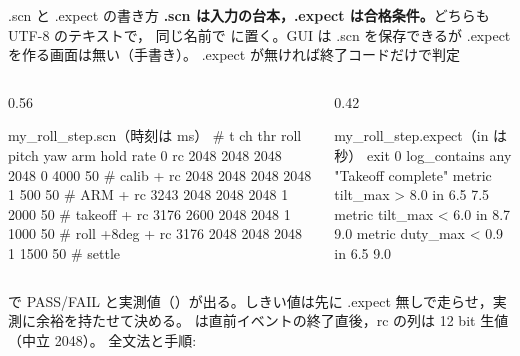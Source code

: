 \begin{frame}[fragile]{.scn と .expect の書き方\later}
  {\scriptsize \textbf{.scn は入力の台本，.expect は合格条件。}どちらも UTF-8 のテキストで，
  同じ名前で  に置く。GUI は .scn を保存できるが .expect を作る画面は無い（手書き）。
  .expect が無ければ終了コードだけで判定}

  \vspace{-0.2em}
  \begin{columns}[T]
    \begin{column}{0.56\textwidth}
      \begin{sflisting}[basicstyle=\ttfamily\tiny]{my\_roll\_step.scn（時刻は ms）}
# t  ch  thr  roll pitch yaw  arm hold rate
  0  rc  2048 2048 2048 2048  0   4000 50   # calib
  +  rc  2048 2048 2048 2048  1   500  50   # ARM
  +  rc  3243 2048 2048 2048  1   2000 50   # takeoff
  +  rc  3176 2600 2048 2048  1   1000 50   # roll +8deg
  +  rc  3176 2048 2048 2048  1   1500 50   # settle
      \end{sflisting}
    \end{column}
    \begin{column}{0.42\textwidth}
      \begin{sflisting}[basicstyle=\ttfamily\tiny]{my\_roll\_step.expect（in は秒）}
exit 0
log_contains any "Takeoff complete"
metric tilt_max > 8.0 in 6.5 7.5
metric tilt_max < 6.0 in 8.7 9.0
metric duty_max < 0.9 in 6.5 9.0
      \end{sflisting}
    \end{column}
  \end{columns}

  \vspace{-0.3em}
  {\scriptsize {} で
  PASS/FAIL と実測値（）が出る。しきい値は先に .expect 無しで走らせ，実測に余裕を持たせて決める。
  \code{+} は直前イベントの終了直後，rc の列は 12 bit 生値（中立 2048）。
  全文法と手順: }
\end{frame}

